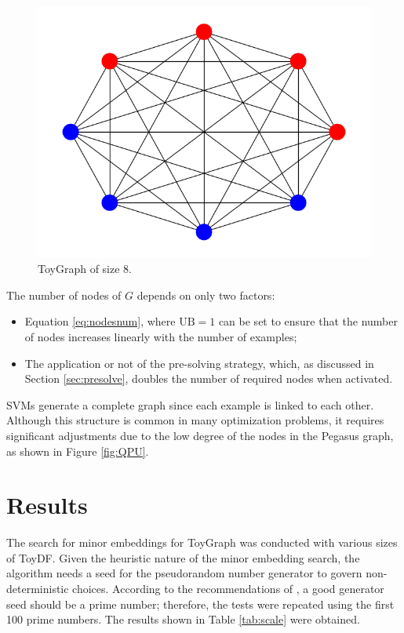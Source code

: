 \begin{figure}[H]
    \centering
    \includegraphics[scale=0.5]{figures/toygraph.png}
    \caption{ToyGraph of size $8$.}
    \label{fig:toydfgraph}
\end{figure}

The number of nodes of $G$ depends on only two factors:

\begin{itemize} 
	\item Equation \ref{eq:nodesnum}, where $\text{UB} = 1$ can be set to ensure that the number of nodes increases linearly with the number of examples; 
	\item The application or not of the pre-solving strategy, which, as discussed in Section \ref{sec:presolve}, doubles the number of required nodes when activated. 
\end{itemize}

SVMs generate a complete graph since each example is linked to each other. 
Although this structure is common in many optimization problems, it requires significant adjustments due to the low degree of the nodes in the Pegasus graph, as shown in Figure \ref{fig:QPU}.

\section{Results}\label{sec:qpu-res}

The search for minor embeddings for ToyGraph was conducted with various sizes of ToyDF. 
Given the heuristic nature of the minor embedding search, the algorithm needs a seed for the pseudorandom number generator to govern non-deterministic choices. 
According to the recommendations of \cite{random}, a good generator seed should be a prime number; therefore, the tests were repeated using the first 100 prime numbers.
The results shown in Table \ref{tab:scale} were obtained.

